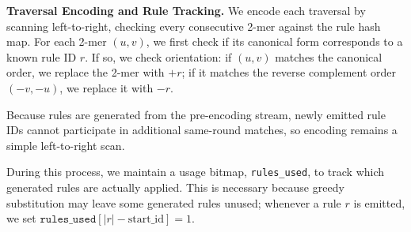 \noindent \textbf{Traversal Encoding and Rule Tracking.}
We encode each traversal by scanning left-to-right, checking every consecutive 2-mer against the rule hash map. For each 2-mer $(u, v)$, we first check if its canonical form corresponds to a known rule ID $r$. If so, we check orientation: if $(u, v)$ matches the canonical order, we replace the 2-mer with $+r$; if it matches the reverse complement order $(-v, -u)$, we replace it with $-r$.

Because rules are generated from the pre-encoding stream, newly emitted rule IDs cannot participate in additional same-round matches, so encoding remains a simple left-to-right scan.

During this process, we maintain a usage bitmap, \texttt{rules\_used}, to track which generated rules are actually applied. This is necessary because greedy substitution may leave some generated rules unused; whenever a rule $r$ is emitted, we set $\texttt{rules\_used}[|r| - \text{start\_id}] = 1$.


